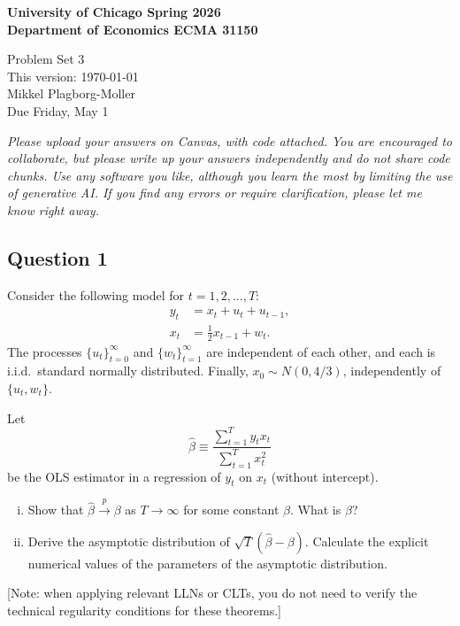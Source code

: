 \documentclass[12pt]{article}
\theoremstyle{plain}
\begin{document}
{\noindent \bf University of Chicago \hfill
Spring 2026 \\
Department of Economics \hfill ECMA 31150}

\begin{center}
{\Large Problem Set 3} \\
This version: \today \\[1ex]
Mikkel Plagborg-Moller \\
\vspace{0.5\baselineskip}
Due Friday, May 1
\end{center}
\vspace{0.2\baselineskip}

\noindent \emph{Please upload your answers on Canvas, with code attached. You are encouraged to collaborate, but please write up your answers independently and do not share code chunks. Use any software you like, although you learn the most by limiting the use of generative AI. If you find any errors or require clarification, please let me know right away.}

\subsection*{Question 1}
Consider the following model for $t=1,2,\dots,T$:
\begin{align*}
y_t &= x_t + u_t + u_{t-1}, \\
x_t &= \tfrac{1}{2} x_{t-1} + w_t.
\end{align*}
The processes $\lbrace u_t \rbrace_{t=0}^\infty$ and $\lbrace w_t \rbrace_{t=1}^\infty$ are independent of each other, and each is i.i.d.\ standard normally distributed. Finally, $x_0 \sim N(0,4/3)$, independently of $\lbrace u_t,w_t \rbrace$.

Let
\[\hat{\beta} \equiv \frac{\sum_{t=1}^T y_tx_t}{\sum_{t=1}^T x_t^2}\]
be the OLS estimator in a regression of $y_t$ on $x_t$ (without intercept).

\begin{enumerate}[i)]
\item Show that $\hat{\beta} \overset{p}{\to} \beta$ as $T \to \infty$ for some constant $\beta$. What is $\beta$?
\item Derive the asymptotic distribution of $\sqrt{T}(\hat{\beta}-\beta)$. Calculate the explicit numerical values of the parameters of the asymptotic distribution.
\end{enumerate}
[Note: when applying relevant LLNs or CLTs, you do not need to verify the technical regularity conditions for these theorems.]
\end{document}
